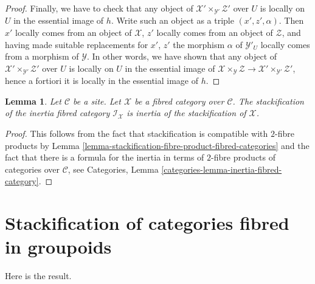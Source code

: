 \documentclass{stacks-project}
\theoremstyle{plain}
\newtheorem{lemma}[subsection]{Lemma}
\theoremstyle{definition}
\theoremstyle{remark}
\numberwithin{equation}{subsection}
\begin{document}
\begin{proof}
\medskip\noindent
Finally, we have to check that any object of
$\mathcal{X}' \times_{\mathcal{Y}'} \mathcal{Z}'$
over $U$ is locally on $U$ in the essential image of $h$.
Write such an object as a triple $(x', z', \alpha)$.
Then $x'$ locally comes from an object of $\mathcal{X}$,
$z'$ locally comes from an object of $\mathcal{Z}$, and
having made suitable replacements for $x'$, $z'$ the morphism
$\alpha$ of $\mathcal{Y}'_U$ locally comes from a morphism of
$\mathcal{Y}$. In other words, we have shown that any object of
$\mathcal{X}' \times_{\mathcal{Y}'} \mathcal{Z}'$
over $U$ is locally on $U$ in the essential image of
$\mathcal{X} \times_\mathcal{Y} \mathcal{Z} \to
\mathcal{X}' \times_{\mathcal{Y}'} \mathcal{Z}'$, hence
a fortiori it is locally in the essential image of $h$.
\end{proof}

\begin{lemma}
\label{lemma-stackification-inertia}
Let $\mathcal{C}$ be a site.
Let $\mathcal{X}$ be a fibred category over $\mathcal{C}$.
The stackification of the inertia fibred category $\mathcal{I}_\mathcal{X}$
is inertia of the stackification of $\mathcal{X}$.
\end{lemma}

\begin{proof}
This follows from the fact that stackification is compatible
with $2$-fibre products by
Lemma \ref{lemma-stackification-fibre-product-fibred-categories}
and the fact that there is a formula for the inertia in terms of
$2$-fibre products of categories over $\mathcal{C}$, see
Categories, Lemma \ref{categories-lemma-inertia-fibred-category}.
\end{proof}





\section{Stackification of categories fibred in groupoids}
\label{section-stackify-groupoids}

\noindent
Here is the result.
\end{document}
